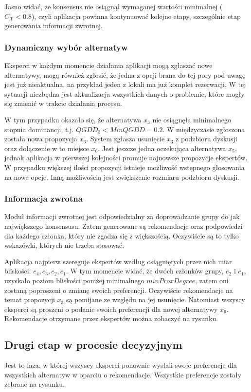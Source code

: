 Jasno widać, że konsensus nie osiągnął wymaganej wartości minimalnej
($C_{\mathcal{X}} < 0.8$), czyli aplikacja powinna kontynuować kolejne etapy,
szczególnie etap generowania informacji zwrotnej.

\subsubsection{Dynamiczny wybór alternatyw}
Eksperci w każdym momencie działania aplikacji mogą zgłaszać nowe alternatywy,
mogą również zgłosić, że jedna z opcji brana do tej pory pod uwagę jest już
nieaktualna, na przykład jeden z lokali ma już komplet rezerwacji.
W tej sytuacji niezbędna jest aktualizacja wszystkich danych o problemie, które
mogły się zmienić w trakcie działania procesu.

W tym przypadku okazało się, że alternatywa $x_3$ nie osiągnęła minimalnego
stopnia dominancji, t.j. $QGDD_3 < MinQGDD = 0.2$. W międzyczasie zgłoszona
została nowa propozycja $x_6$. System zgłasza usunięcie $x_3$ z
podzbioru dyskusji oraz dołączenie w to miejsce $x_6$. Jest jeszcze jedna
oczekująca alternatywa $x_5$, jednak aplikacja w pierwszej kolejności promuje
najnowsze propozycje ekspertów. W przypadku większej ilości propozycji istnieje
możliwość wstępnego głosowania na nowe opcje. Inną możliwością jest zwiększenie
rozmiaru podzbioru dyskusji.

\subsubsection{Informacja zwrotna}
Moduł informacji zwrotnej jest odpowiedzialny za doprowadzanie grupy do jak
największego konsensusu. Zatem generowane są rekomendacje oraz podpowiedzi dla
każdego członka, który nie zgadza się z większością. Oczywiście są to tylko
wskazówki, których nie trzeba stosować.

Aplikacja najpierw szereguje ekspertów według osiągniętych przez nich miar
bliskości: $e_4, e_3, e_2, e_1$. W tym momencie widać, że dwóch członków grupy,
$e_2$ i $e_1$, uzyskało poziom bliskości poniżej minimalnego $minProxDegree$,
zatem oni zostaną poproszeni o zmianę swoich preferencji. Oczywiście
rekomendacje na temat propozycji $x_3$ są pomijane ze względu na jej usunięcie.
Natomiast wszyscy eksperci są proszeni o podanie swoich preferencji dla nowej
alternatywy $x_6$. Rekomendacje otrzymane przez ekspertów można zobaczyć na
rysunku. 

\subsection{Drugi etap w procesie decyzyjnym}
Jest to faza, w której wszyscy eksperci ponownie wysłali swoje preferencje dla
wszystkich alternatyw w oparciu o rekomendacje. Wszystkie preferencje zostały
zebrane na rysunku. 

